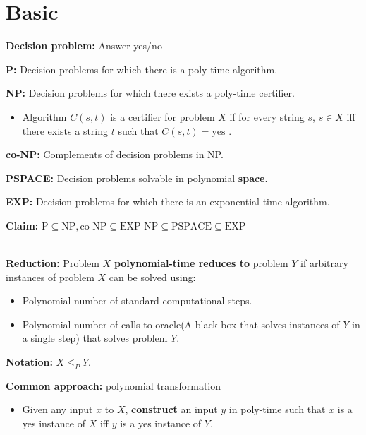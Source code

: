 \documentclass{article}
\begin{document}
\section*{Basic}
\textbf{Decision problem: } Answer yes/no

\textbf{P: } Decision problems for which there is a poly-time algorithm.

\textbf{NP: } Decision problems for which there exists a poly-time certifier.
\begin{itemize}
    \item Algorithm $C(s, t)$ is a certifier for problem $X$ if for every string $s$, 
    $s\in X$ iff there exists a string $t$ such that $C(s, t) = \text{yes}$ .
\end{itemize}

\textbf{co-NP: } Complements of decision problems in NP.

\textbf{PSPACE: } Decision problems solvable in polynomial \textbf{space}.

\textbf{EXP: } Decision problems for which there is an exponential-time
algorithm.

\textbf{Claim: } $\text{P} \subseteq \text{NP}, \text{co-NP} \subseteq \text{EXP}$ \qquad
$ \text{NP}\subseteq \text{PSPACE} \subseteq \text{EXP} $

~\\
\textbf{Reduction: }
Problem $X$ \textbf{polynomial-time reduces to} problem $Y$ if arbitrary instances of problem $X$ can be solved using:
\begin{itemize}
    \item Polynomial number of standard computational steps.
    \item Polynomial number of calls to oracle(A black box that solves instances of $Y$ in a single step) that solves problem $Y$.
\end{itemize}
\textbf{Notation: } $X \leq_P Y$.

\noindent
\textbf{Common approach: }
polynomial transformation
\begin{itemize}
    \item Given any input $x$ to $X$, 
    \textbf{construct} an input $y$ in poly-time such that $x$
    is a yes instance of $X$ iff $y$ is a yes instance of $Y$.
\end{itemize}
\end{document}
